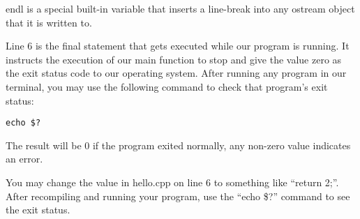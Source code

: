 \documentclass[a4paper,12pt]{article}
\begin{document}
endl is a special built-in variable that inserts a line-break into any ostream object that it is written to.

Line 6 is the final statement that gets executed while our program is running. It instructs the execution of our main function to stop and give the value zero as the exit status code to our operating system. After running any program in our terminal, you may use the following command to check that program's exit status:

\lstset{numbers=none}
\begin{lstlisting}
echo $?
\end{lstlisting}

The result will be 0 if the program exited normally, any non-zero value indicates an error.

You may change the value in hello.cpp on line 6 to something like ``return 2;''. After recompiling and running your program, use the ``echo \$?'' command to see the exit status.
\end{document}
